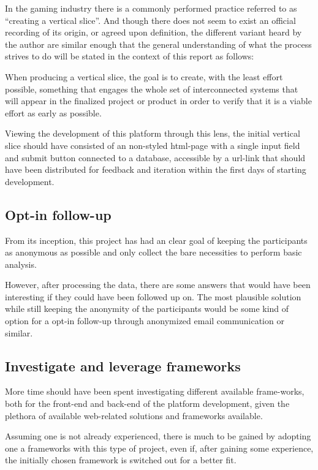  In the gaming industry there is a commonly performed practice referred to as
  ``creating a vertical slice''. And though there does not seem to exist an
  official recording of its origin, or agreed upon definition, the different
  variant heard by the author are similar enough that the general understanding
  of what the process strives to do will be stated in the context of this
  report as follows:

  When producing a vertical slice, the goal is to create, with the least effort
  possible, something that engages the whole set of interconnected systems that
  will appear in the finalized project or product in order to verify that it is
  a viable effort as early as possible.

  Viewing the development of this platform through this lens, the initial vertical
  slice should have consisted of an non-styled html-page with a single input
  field and submit button connected to a database, accessible by a url-link
  that should have been distributed for feedback and iteration within the first
  days of starting development.

  \subsection{Opt-in follow-up}

  From its inception, this project has had an clear goal of keeping the
  participants as anonymous as possible and only collect the bare necessities
  to perform basic analysis.

  However, after processing the data, there are some answers that would have
  been interesting if they could have been followed up on. The most plausible
  solution while still keeping the anonymity of the participants would be some
  kind of option for a opt-in follow-up through anonymized email communication
  or similar.

  \subsection{Investigate and leverage frameworks}

  More time should have been spent investigating different available
  frame-works, both for the front-end and back-end of the platform development,
  given the plethora of available web-related solutions and frameworks available.

  Assuming one is not already experienced, there is much to be gained by
  adopting one a frameworks with this type of project, even if, after gaining
  some experience, the initially chosen framework is switched out for a better
  fit.

